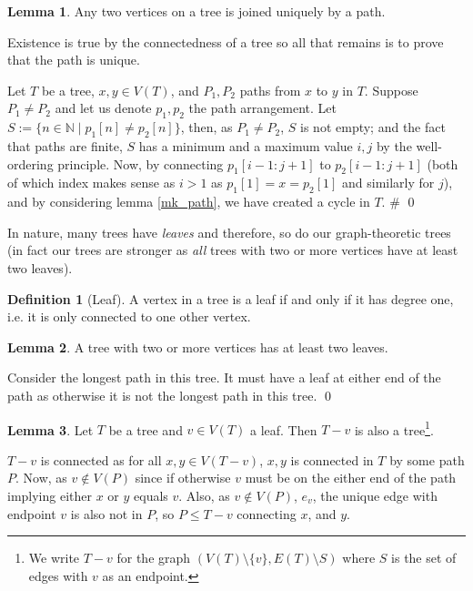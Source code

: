\documentclass[
]{article}
\theoremstyle{definition}
\newtheorem{lemma}{Lemma}
\theoremstyle{definition}
\newtheorem{definition}{Definition}[section]
\begin{document}
\begin{lemma}
  Any two vertices on a tree is joined uniquely by a path.
\end{lemma}
\proof

Existence is true by the connectedness of a tree so all that remains is
to prove that the path is unique.

Let \(T\) be a tree, \(x, y \in V(T)\), and \(P_1, P_2\) paths from
\(x\) to \(y\) in \(T\). Suppose \(P_1 \neq P_2\) and let us denote
\(p_1, p_2\) the path arrangement. Let
\(S := \{ n \in \mathbb{N} \mid p_1[n] \neq p_2[n]\}\), then, as
\(P_1 \neq P_2\), \(S\) is not empty; and the fact that paths are
finite, \(S\) has a minimum and a maximum value \(i, j\) by the
well-ordering principle. Now, by connecting \(p_1[i - 1 : j + 1]\) to
\(p_2[i - 1 : j + 1]\) (both of which index makes sense as \(i > 1\) as
\(p_1[1] = x = p_2[1]\) and similarly for \(j\)), and by considering
lemma \ref{mk_path}, we have created a cycle in \(T\). \# \qed

In nature, many trees have \emph{leaves} and therefore, so do our
graph-theoretic trees (in fact our trees are stronger as \emph{all}
trees with two or more vertices have at least two leaves).

\begin{definition}[Leaf]
  A vertex in a tree is a leaf if and only if it has degree one, i.e. it is only 
  connected to one other vertex.
\end{definition}

\begin{lemma}\label{two_leaves}
  A tree with two or more vertices has at least two leaves.
\end{lemma}
\proof

Consider the longest path in this tree. It must have a leaf at either
end of the path as otherwise it is not the longest path in this tree.
\qed

\begin{lemma}\label{sub_leaf_is_tree}
  Let \(T\) be a tree and \(v \in V(T)\) a leaf. Then \(T - v\) is also a 
  tree\footnote{We write \(T - v\) for the graph 
  \((V(T)\setminus\{v\}, E(T)\setminus S)\) where \(S\) is the set of edges 
  with \(v\) as an endpoint.}.
\end{lemma}
\proof

\(T - v\) is connected as for all \(x, y \in V(T - v)\), \(x, y\) is
connected in \(T\) by some path \(P\). Now, as \(v \notin V(P)\) since
if otherwise \(v\) must be on the either end of the path implying either
\(x\) or \(y\) equals \(v\). Also, as \(v \notin V(P)\), \(e_v\), the
unique edge with endpoint \(v\) is also not in \(P\), so \(P \le T - v\)
connecting \(x\), and \(y\).
\end{document}
